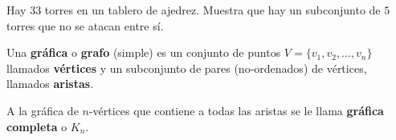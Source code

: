
\begin{problema}
Hay $33$ torres en un tablero de ajedrez. Muestra que hay un subconjunto de $5$ torres que no se atacan entre sí.
\end{problema}


\newpage

Una {\bf gráfica} o {\bf grafo} (simple) es un conjunto de puntos $V=\{v_1, v_2,\dots, v_n \}$ llamados {\bf vértices} y un subconjunto de pares (no-ordenados) de vértices, llamados {\bf aristas}. 

A la gráfica de $n$-vértices que contiene a todas las aristas se le llama {\bf gráfica completa} o $K_n$.

